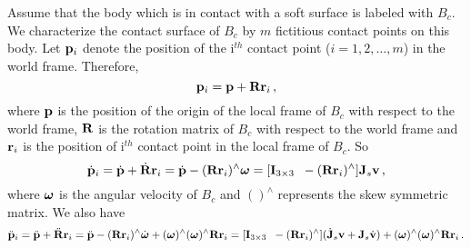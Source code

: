 \documentclass[a4paper, 11pt]{article}
\begin{document}
Assume that the body which is in contact with a soft surface is labeled with
$B_c$.  We characterize the contact surface of $B_c$ by $m$ fictitious contact
points on this body.  Let $\mathbf{p}_i$ denote the position of the i$^{th}$ contact
point ($i=1,2,\ldots,m$) in the world frame.  Therefore,
%
\begin{equation}
  \mathbf{p}_i = \mathbf{p} + \mathbf{R} \mathbf{r}_i \, ,
\end{equation}
%
where $\mathbf{p}$ is the position of the origin of the local frame of $B_c$ with
respect to the world frame, $\mathbf{R}$ is the rotation matrix of $B_c$ with respect
to the world frame and $\mathbf{r}_i$ is the position of i$^{th}$ contact point in
the local frame of $B_c$.  So
%
\begin{equation}
  \dot{\mathbf{p}}_i = \dot{\mathbf{p}} + \dot{\mathbf{R}} \mathbf{r}_i = \dot{\mathbf{p}} - (\mathbf{R}\mathbf{r}_i)^{\wedge}
  \boldsymbol{\omega} = [ \mathbf{I}_{3 \times 3} \; \; {}-(\mathbf{R}\mathbf{r}_i)^{\wedge} ] \mathbf{J}_s \mathbf{v} \, ,
  \label{pidot}
\end{equation}
%
where $\boldsymbol{\omega}$ is the angular velocity of $B_c$ and $()^{\wedge}$ represents
the skew symmetric matrix.  We also have
%
\begin{equation}
  \ddot{\mathbf{p}}_i = \ddot{\mathbf{p}} + \ddot{\mathbf{R}} \mathbf{r}_i = \ddot{\mathbf{p}} - (\mathbf{R}
  \mathbf{r}_i)^{\wedge} \dot{\boldsymbol{\omega}} + (\boldsymbol{\omega})^{\wedge} (\boldsymbol{\omega})^{\wedge} \mathbf{R}
  \mathbf{r}_i = [ \mathbf{I}_{3 \times 3} \; \; {}-(\mathbf{R} \mathbf{r}_i)^{\wedge}] (\dot{\mathbf{J}}_s \mathbf{v} +
  \mathbf{J}_s \dot{\mathbf{v}}) + (\boldsymbol{\omega})^{\wedge} (\boldsymbol{\omega})^{\wedge} \mathbf{R} \mathbf{r}_i \, .
  \label{piddot}
\end{equation}
%
\end{document}

